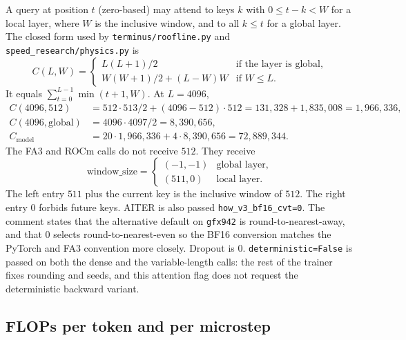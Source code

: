 \documentclass[11pt]{article}
\DeclareRobustCommand{\code}[1]{\texttt{#1}}
\begin{document}
A query at position \(t\) (zero-based) may attend to keys \(k\) with
\(0\le t-k < W\) for a local layer, where \(W\) is the inclusive window, and
to all \(k\le t\) for a global layer. The closed form used by
\code{terminus/roofline.py} and \code{speed\_research/physics.py} is
\begin{equation}
C(L,W)=
\begin{cases}
L(L+1)/2 & \text{if the layer is global},\\
W(W+1)/2+(L-W)W & \text{if }W\le L.
\end{cases}
\end{equation}
It equals \(\sum_{t=0}^{L-1}\min(t+1,W)\). At \(L=4096\),
\begin{align*}
C(4096,512)
 &= 512\cdot 513/2+(4096-512)\cdot 512
  = 131{,}328+1{,}835{,}008
  = 1{,}966{,}336,\\
C(4096,\text{global})
 &= 4096\cdot 4097/2
  = 8{,}390{,}656,\\
C_{\mathrm{model}}
 &= 20\cdot 1{,}966{,}336+4\cdot 8{,}390{,}656
  = 72{,}889{,}344.
\end{align*}
The FA3 and ROCm calls do not receive \(512\). They receive
\begin{equation}
\mathrm{window\_size}=
\begin{cases}
(-1,-1) & \text{global layer},\\
(511,0) & \text{local layer}.
\end{cases}
\end{equation}
The left entry \(511\) plus the current key is the inclusive window of
\(512\). The right entry \(0\) forbids future keys. AITER is also passed
\code{how\_v3\_bf16\_cvt=0}. The comment states that the alternative default
on \code{gfx942} is round-to-nearest-away, and that \(0\) selects
round-to-nearest-even so the BF16 conversion matches the PyTorch and FA3
convention more closely. Dropout is \(0\). \code{deterministic=False} is
passed on both the dense and the variable-length calls: the rest of the
trainer fixes rounding and seeds, and this attention flag does not request
the deterministic backward variant.

\subsection{FLOPs per token and per microstep}
\end{document}
